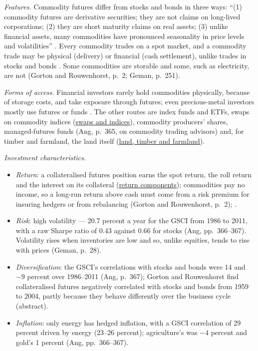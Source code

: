 \begin{qfdefinition}\label{def:commodity-features}
 \emph{Features.} Commodity futures differ from stocks and bonds in three ways: ``(1) commodity futures are derivative securities; they are not claims on long-lived corporations; (2) they are short maturity claims on real assets; (3) unlike financial assets, many commodities have pronounced seasonality in price levels and volatilities'' \citep[p.~2]{s16-r34}. Every commodity trades on a spot market, and a commodity trade may be physical (delivery) or financial (cash settlement), unlike trades in stocks and bonds \citep[pp.~1--2]{physical-geman-commodities-2005}. Some commodities are storable and some, such as electricity, are not (Gorton and Rouwenhorst, p.~2; Geman, p.~251).

\emph{Forms of access.} Financial investors rarely hold commodities physically, because of storage costs, and take exposure through futures; even precious-metal investors mostly use futures or funds \citep[p.~365]{s7-ang}. The other routes are index funds and ETFs, swaps on commodity indices (\hyperref[meth:commodity-swaps-index-construction]{swaps and indices}), commodity producers' shares, managed-futures funds (Ang, p.~365, on commodity trading advisors) and, for timber and farmland, the land itself (\hyperref[meth:land-timber-farmland]{land, timber and farmland}).

\emph{Investment characteristics.}
\begin{itemize}
\item \emph{Return}: a collateralised futures position earns the spot return, the roll return and the interest on its collateral (\hyperref[meth:commodity-futures-return-components]{return components}); commodities pay no income, so a long-run return above cash must come from a risk premium for insuring hedgers or from rebalancing (Gorton and Rouwenhorst, p.~2); \citep[pp.~10--12, 24--25]{wide-erb-harvey-commodity}.
\item \emph{Risk}: high volatility --- 20.7 percent a year for the GSCI from 1986 to 2011, with a raw Sharpe ratio of 0.43 against 0.66 for stocks (Ang, pp.~366--367). Volatility rises when inventories are low and so, unlike equities, tends to rise with prices (Geman, p.~28).
\item \emph{Diversification}: the GSCI's correlations with stocks and bonds were 14 and $-9$ percent over 1986--2011 (Ang, p.~367); Gorton and Rouwenhorst find collateralised futures negatively correlated with stocks and bonds from 1959 to 2004, partly because they behave differently over the business cycle (abstract).
\item \emph{Inflation}: only energy has hedged inflation, with a GSCI correlation of 29 percent driven by energy (23--26 percent); agriculture's was $-4$ percent and gold's 1 percent (Ang, pp.~366--367).
\end{itemize}


\end{qfdefinition}
